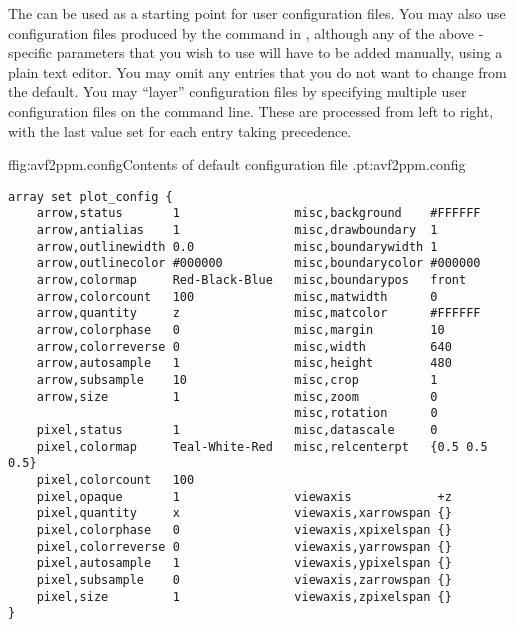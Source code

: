 The  can be used as a starting point for
user configuration files.  You may also use configuration files produced
by the  command in
, although any of the above
-specific parameters that you wish to use will have to be
added manually, using a plain text editor.  You may omit any entries
that you do not want to change from the default.  You may ``layer''
configuration files by specifying multiple user configuration files on
the command line.  These are processed from left to right, with the last
value set for each entry taking precedence.

\begin{codelisting}{f}{fig:avf2ppm.config}{Contents of default configuration
file .}{pt:avf2ppm.config}
\begin{verbatim}
array set plot_config {
    arrow,status       1                misc,background    #FFFFFF
    arrow,antialias    1                misc,drawboundary  1
    arrow,outlinewidth 0.0              misc,boundarywidth 1
    arrow,outlinecolor #000000          misc,boundarycolor #000000
    arrow,colormap     Red-Black-Blue   misc,boundarypos   front
    arrow,colorcount   100              misc,matwidth      0
    arrow,quantity     z                misc,matcolor      #FFFFFF
    arrow,colorphase   0                misc,margin        10
    arrow,colorreverse 0                misc,width         640
    arrow,autosample   1                misc,height        480
    arrow,subsample    10               misc,crop          1
    arrow,size         1                misc,zoom          0
                                        misc,rotation      0
    pixel,status       1                misc,datascale     0
    pixel,colormap     Teal-White-Red   misc,relcenterpt   {0.5 0.5 0.5}
    pixel,colorcount   100
    pixel,opaque       1                viewaxis            +z
    pixel,quantity     x                viewaxis,xarrowspan {}
    pixel,colorphase   0                viewaxis,xpixelspan {}
    pixel,colorreverse 0                viewaxis,yarrowspan {}
    pixel,autosample   1                viewaxis,ypixelspan {}
    pixel,subsample    0                viewaxis,zarrowspan {}
    pixel,size         1                viewaxis,zpixelspan {}
}
\end{verbatim}
\end{codelisting}

